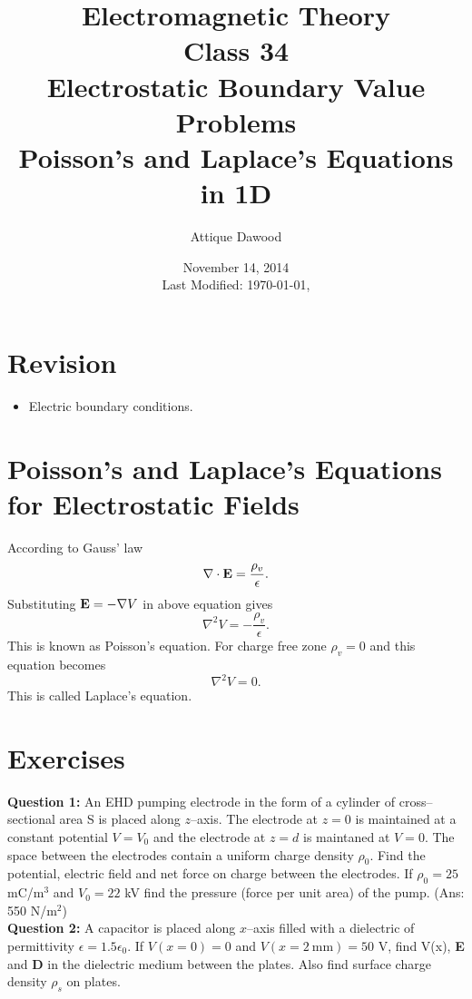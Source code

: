 \documentclass[12pt,a4paper]{article}
\title{Electromagnetic Theory\\Class 34\\Electrostatic Boundary Value Problems\\Poisson's and Laplace's Equations in 1D}
\author{Attique Dawood}
\date{November 14, 2014\\[0.2cm] Last Modified: \today, \currenttime}
\begin{document}
\maketitle
\section{Revision}
\begin{itemize}
\item Electric boundary conditions.
\end{itemize}
\section{Poisson's and Laplace's Equations for Electrostatic Fields}
According to Gauss' law
\begin{equation}
\nabla\cdot\mathrm{\textbf E}=\dfrac{\rho_v}{\epsilon}.
\end{equation}
Substituting $\mathrm{\textbf E}=-\nabla V$ in above equation gives
\begin{equation}
\nabla^2V=-\dfrac{\rho_v}{\epsilon}.
\end{equation}
This is known as Poisson's equation. For charge free zone $\rho_v=0$ and this equation becomes
\begin{equation}
\nabla^2V=0.
\end{equation}
This is called Laplace's equation.
\section{Exercises}
\noindent\textbf{Question 1:} An EHD pumping electrode in the form of a cylinder of cross--sectional area S is placed along $z$--axis. The electrode at $z=0$ is maintained at a constant potential $V=V_0$ and the electrode at $z=d$ is maintaned at $V=0$. The space between the electrodes contain a uniform charge density $\rho_0$. Find the potential, electric field and net force on charge between the electrodes. If $\rho_0=25$ mC/m$^3$ and $V_0=22$ kV find the pressure (force per unit area) of the pump. (Ans: 550 N/m$^2$)\\[0.2cm]
\noindent\textbf{Question 2:} A capacitor is placed along $x$--axis filled with a dielectric of permittivity $\epsilon=1.5\epsilon_0$. If $V(x=0)=0$ and $V(x=2\mathrm{~mm})=50$ V, find V(x), \textbf{E} and \textbf{D} in the dielectric medium between the plates. Also find surface charge density $\rho_s$ on plates.
%
%
\end{document}
